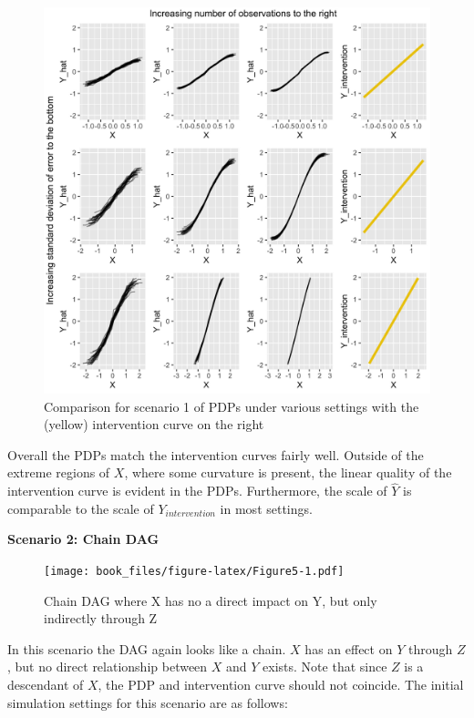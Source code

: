 \documentclass[]{krantz}
\begin{document}
\begin{figure}

\includegraphics[width=1\linewidth]{images/scenario1_all} \hfill{}

\caption{Comparison for scenario 1 of PDPs under various settings with the (yellow) intervention curve on the right}\label{fig:Figure4}
\end{figure}

Overall the PDPs match the intervention curves fairly well. Outside of
the extreme regions of \(X\), where some curvature is present, the
linear quality of the intervention curve is evident in the PDPs.
Furthermore, the scale of \(\hat{Y}\) is comparable to the scale of
\(Y_{intervention}\) in most settings.

\textbf{Scenario 2: Chain DAG}

\begin{figure}
\centering
\texttt{[image: book\_files/figure-latex/Figure5-1.pdf]}
\caption{\label{fig:Figure5}Chain DAG where X has no a direct impact on Y,
but only indirectly through Z}
\end{figure}

In this scenario the DAG again looks like a chain. \(X\) has an effect
on \(Y\) through \(Z\), but no direct relationship between \(X\) and
\(Y\) exists. Note that since \(Z\) is a descendant of \(X\), the PDP
and intervention curve should not coincide. The initial simulation
settings for this scenario are as follows:
\end{document}
